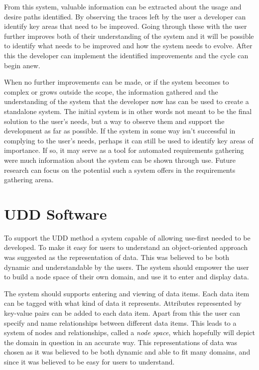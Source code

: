 \documentclass[a4paper]{report}
\begin{document}
From this system, valuable information can be extracted about the usage and desire paths identified. By observing the traces left by the user a developer can identify key areas that need to be improved. Going through these with the user further improves both of their understanding of the system and it will be possible to identify what needs to be improved and how the system needs to evolve. After this the developer can implement the identified improvements and the cycle can begin anew.

When no further improvements can be made, or if the system becomes to complex or grows outside the scope, the information gathered and the understanding of the system that the developer now has can be used to create a standalone system. The initial system is in other words not meant to be the final solution to the user's needs, but a way to observe them and support the development as far as possible. If the system in some way isn't successful in complying to the user's needs, perhaps it can still be used to identify key areas of importance. If so, it may serve as a tool for automated requirements gathering were much information about the system can be shown through use. Future research can focus on the potential such a system offers in the requirements gathering arena.

\section{UDD Software} \label{sec:udd-software}
To support the UDD method a system capable of allowing use-first needed to be developed. To make it easy for users to understand an object-oriented approach was suggested as the representation of data. This was believed to be both dynamic and understandable by the users. The system should empower the user to build a node space of their own domain, and use it to enter and display data. 

The system should supports entering and viewing of data items. Each data item can be tagged with what kind of data it represents. Attributes represented by key-value pairs can be added to each data item. Apart from this the user can specify and name relationships between different data items. This leads to a system of nodes and relationships, called a \emph{node space}, which hopefully will depict the domain in question in an accurate way. This representations of data was chosen as it was believed to be both dynamic and able to fit many domains, and since it was believed to be easy for users to understand.
\end{document}
